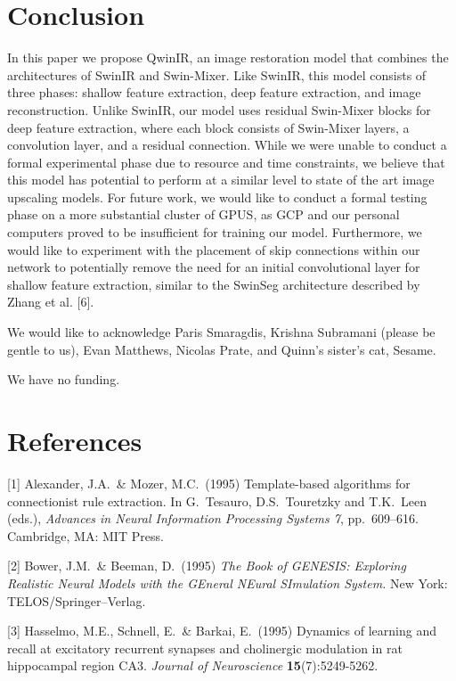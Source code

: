 \documentclass{article}
\begin{document}
\section{Conclusion}

In this paper we propose QwinIR, an image restoration model that combines the architectures of SwinIR and Swin-Mixer. Like SwinIR, this model consists of three phases: shallow feature extraction, deep feature extraction, and image reconstruction. Unlike SwinIR, our model uses residual Swin-Mixer blocks for deep feature extraction, where each block consists of Swin-Mixer layers, a convolution layer, and a residual connection. While we were unable to conduct a formal experimental phase due to resource and time constraints, we believe that this model has potential to perform at a similar level to state of the art image upscaling models. For future work, we would like to conduct a formal testing phase on a more substantial cluster of GPUS, as GCP and our personal computers proved to be insufficient for training our model. Furthermore, we would like to experiment with the placement of skip connections within our network to potentially remove the need for an initial convolutional layer for shallow feature extraction, similar to the SwinSeg architecture described by Zhang et al. [6].

\begin{ack}
    We would like to acknowledge Paris Smaragdis, Krishna Subramani (please be gentle to us), Evan Matthews, Nicolas Prate, and Quinn’s sister’s cat, Sesame.
    
    We have no funding.
\end{ack}
\section*{References}

 [1] Alexander, J.A.\ \& Mozer, M.C.\ (1995) Template-based algorithms for
connectionist rule extraction. In G.\ Tesauro, D.S.\ Touretzky and T.K.\ Leen
(eds.), {\it Advances in Neural Information Processing Systems 7},
pp.\ 609--616. Cambridge, MA: MIT Press.


    [2] Bower, J.M.\ \& Beeman, D.\ (1995) {\it The Book of GENESIS: Exploring
        Realistic Neural Models with the GEneral NEural SImulation System.}  New York:
TELOS/Springer--Verlag.


[3] Hasselmo, M.E., Schnell, E.\ \& Barkai, E.\ (1995) Dynamics of learning and
recall at excitatory recurrent synapses and cholinergic modulation in rat
hippocampal region CA3. {\it Journal of Neuroscience} {\bf 15}(7):5249-5262.
\end{document}
